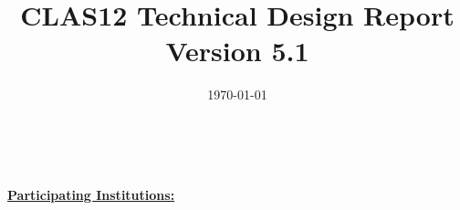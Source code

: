 \documentclass[12pt]{report}
\title{CLAS12 Technical Design Report \\
\Large Version 5.1}
\date{\today}
\begin{document}
%





\maketitle

\thispagestyle{empty}
\vspace{2cm}
\newpage
\thispagestyle{empty}

~~
\vfil
\eject

\noindent
{\bf \large \underline{Participating Institutions:}}\\ 

\vspace{0.3cm}
\end{document}
